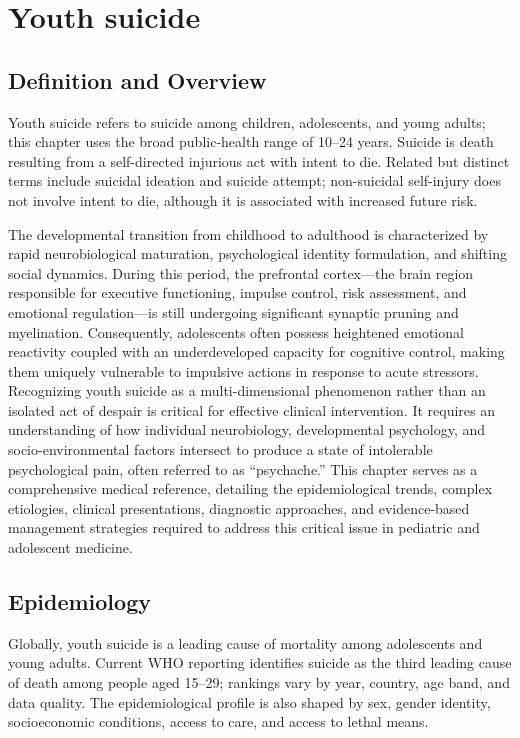 \chapter{Youth suicide}

\section*{Definition and Overview}
Youth suicide refers to suicide among children, adolescents, and young adults; this chapter uses the broad public-health range of 10--24 years. Suicide is death resulting from a self-directed injurious act with intent to die. Related but distinct terms include suicidal ideation and suicide attempt; non-suicidal self-injury does not involve intent to die, although it is associated with increased future risk.

The developmental transition from childhood to adulthood is characterized by rapid neurobiological maturation, psychological identity formulation, and shifting social dynamics. During this period, the prefrontal cortex---the brain region responsible for executive functioning, impulse control, risk assessment, and emotional regulation---is still undergoing significant synaptic pruning and myelination. Consequently, adolescents often possess heightened emotional reactivity coupled with an underdeveloped capacity for cognitive control, making them uniquely vulnerable to impulsive actions in response to acute stressors. Recognizing youth suicide as a multi-dimensional phenomenon rather than an isolated act of despair is critical for effective clinical intervention. It requires an understanding of how individual neurobiology, developmental psychology, and socio-environmental factors intersect to produce a state of intolerable psychological pain, often referred to as ``psychache.'' This chapter serves as a comprehensive medical reference, detailing the epidemiological trends, complex etiologies, clinical presentations, diagnostic approaches, and evidence-based management strategies required to address this critical issue in pediatric and adolescent medicine.

\section*{Epidemiology}
Globally, youth suicide is a leading cause of mortality among adolescents and young adults. Current WHO reporting identifies suicide as the third leading cause of death among people aged 15--29; rankings vary by year, country, age band, and data quality. The epidemiological profile is also shaped by sex, gender identity, socioeconomic conditions, access to care, and access to lethal means.

